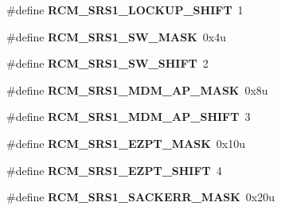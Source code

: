 \begin{DoxyCompactItemize}
\item 
\hypertarget{group___r_c_m___register___masks_ga71f857503a2b2d2e0c30d4762e89a8d8}{}\#define {\bfseries R\+C\+M\+\_\+\+S\+R\+S1\+\_\+\+L\+O\+C\+K\+U\+P\+\_\+\+S\+H\+I\+F\+T}~1\label{group___r_c_m___register___masks_ga71f857503a2b2d2e0c30d4762e89a8d8}

\item 
\hypertarget{group___r_c_m___register___masks_ga72f541acd2a0992ad0d1d089c694ad5f}{}\#define {\bfseries R\+C\+M\+\_\+\+S\+R\+S1\+\_\+\+S\+W\+\_\+\+M\+A\+S\+K}~0x4u\label{group___r_c_m___register___masks_ga72f541acd2a0992ad0d1d089c694ad5f}

\item 
\hypertarget{group___r_c_m___register___masks_ga7e554c1ae96dae684fbc81204283f86c}{}\#define {\bfseries R\+C\+M\+\_\+\+S\+R\+S1\+\_\+\+S\+W\+\_\+\+S\+H\+I\+F\+T}~2\label{group___r_c_m___register___masks_ga7e554c1ae96dae684fbc81204283f86c}

\item 
\hypertarget{group___r_c_m___register___masks_ga6af4d8ed2135b602de575373f22b1af8}{}\#define {\bfseries R\+C\+M\+\_\+\+S\+R\+S1\+\_\+\+M\+D\+M\+\_\+\+A\+P\+\_\+\+M\+A\+S\+K}~0x8u\label{group___r_c_m___register___masks_ga6af4d8ed2135b602de575373f22b1af8}

\item 
\hypertarget{group___r_c_m___register___masks_ga91611da7546b27a939e92926f378229f}{}\#define {\bfseries R\+C\+M\+\_\+\+S\+R\+S1\+\_\+\+M\+D\+M\+\_\+\+A\+P\+\_\+\+S\+H\+I\+F\+T}~3\label{group___r_c_m___register___masks_ga91611da7546b27a939e92926f378229f}

\item 
\hypertarget{group___r_c_m___register___masks_gaaff7d7a53676535a98915b174b862435}{}\#define {\bfseries R\+C\+M\+\_\+\+S\+R\+S1\+\_\+\+E\+Z\+P\+T\+\_\+\+M\+A\+S\+K}~0x10u\label{group___r_c_m___register___masks_gaaff7d7a53676535a98915b174b862435}

\item 
\hypertarget{group___r_c_m___register___masks_ga709ca27033c866f17c9e80ccf6df88b6}{}\#define {\bfseries R\+C\+M\+\_\+\+S\+R\+S1\+\_\+\+E\+Z\+P\+T\+\_\+\+S\+H\+I\+F\+T}~4\label{group___r_c_m___register___masks_ga709ca27033c866f17c9e80ccf6df88b6}

\item 
\hypertarget{group___r_c_m___register___masks_gaa09459c8ed6200a5828221f9d15656d3}{}\#define {\bfseries R\+C\+M\+\_\+\+S\+R\+S1\+\_\+\+S\+A\+C\+K\+E\+R\+R\+\_\+\+M\+A\+S\+K}~0x20u\label{group___r_c_m___register___masks_gaa09459c8ed6200a5828221f9d15656d3}


\end{DoxyCompactItemize}
